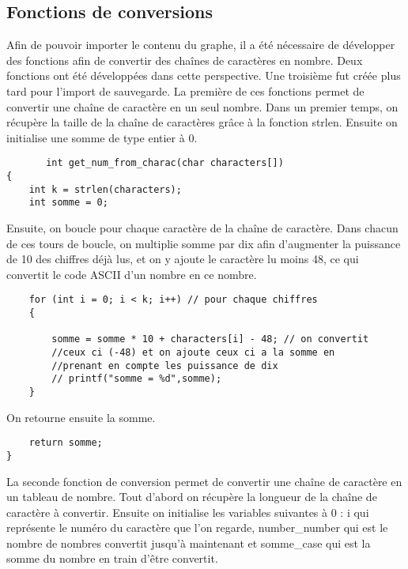 \documentclass[a4paper, 12pt]{article}
\begin{document}
    \newpage
        
    \subsection{Fonctions de conversions}
        Afin de pouvoir importer le contenu du graphe, il a été nécessaire de développer des fonctions afin de convertir des chaînes de caractères en nombre. Deux fonctions ont été développées dans cette perspective. Une troisième fut créée plus tard pour l'import de sauvegarde.
        La première de ces fonctions permet de convertir une chaîne de caractère en un seul nombre.
        Dans un premier temps, on récupère la taille de la chaîne de caractères grâce à la fonction strlen.
        Ensuite on initialise une somme de type entier à 0.
                \begin{lstlisting}
       int get_num_from_charac(char characters[])
{
    int k = strlen(characters);
    int somme = 0;  
                \end{lstlisting}
                Ensuite, on boucle pour chaque caractère de la chaîne de caractère. Dans chacun de ces tours de boucle, on multiplie somme par dix afin d'augmenter la puissance de 10 des chiffres déjà lus, et on y ajoute le caractère lu moins 48, ce qui convertit le code ASCII d'un nombre en ce nombre.
                
                        \begin{lstlisting}
    for (int i = 0; i < k; i++) // pour chaque chiffres
    {

        somme = somme * 10 + characters[i] - 48; // on convertit 
        //ceux ci (-48) et on ajoute ceux ci a la somme en 
        //prenant en compte les puissance de dix
        // printf("somme = %d",somme);
    }
                \end{lstlisting}
                On retourne ensuite la somme.
                
                
                                        \begin{lstlisting}
    return somme;
}
                \end{lstlisting}
                La seconde fonction de conversion permet de convertir une chaîne de caractère en un tableau de nombre.
                Tout d'abord on récupère la longueur de la chaîne de caractère à convertir.
                Ensuite on initialise les variables suivantes à 0 : i qui représente le numéro du caractère que l'on regarde, number\_number qui est le nombre de nombres convertit jusqu'à maintenant et somme\_case qui est la somme du nombre en train d'être convertit.
                
\end{document}
